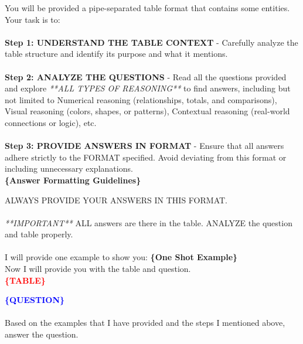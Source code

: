 \documentclass[11pt]{article}
\newcommand{\varred}[1]{\textcolor{red}{\textbf{#1}}}
\newcommand{\varblue}[1]{\textcolor{blue}{\textbf{#1}}}
\newcommand{\vargreen}[1]{\textcolor{olivegreen}{\textbf{#1}}}
\begin{document}
\begin{tcolorbox}[breakable,colback=lightestgray,colframe=black,title=\centering\textbf{Entity Replaced Baseline Prompt}]
You will be provided a pipe-separated table format that contains some entities. Your task is to:\\\\

\textbf{Step 1: UNDERSTAND THE TABLE CONTEXT} -
Carefully analyze the table structure and identify its purpose and what it mentions.\\\\

\textbf{Step 2: ANALYZE THE QUESTIONS} -
Read all the questions provided and explore \textit{**ALL TYPES OF REASONING**} to find answers, including but not limited to Numerical reasoning (relationships, totals, and comparisons), Visual reasoning (colors, shapes, or patterns), Contextual reasoning (real-world connections or logic), etc.\\\\

\textbf{Step 3: PROVIDE ANSWERS IN FORMAT} -
Ensure that all answers adhere strictly to the FORMAT specified. Avoid deviating from this format or including unnecessary explanations.\\
\textbf{\vargreen{\{Answer Formatting Guidelines\}}}

ALWAYS PROVIDE YOUR ANSWERS IN THIS FORMAT.\\\\


\textit{**IMPORTANT**} ALL answers are there in the table. ANALYZE the question and table properly.\\\\

I will provide one example to show you:
\textbf{\vargreen{\{One Shot Example\}}}\\
Now I will provide you with the table and question.\\
\textbf{\varred{\{TABLE\}}}

\textbf{\varblue{\{QUESTION\}}}\\\\

Based on the examples that I have provided and the steps I mentioned above, answer the question.
\end{tcolorbox}
\end{document}
